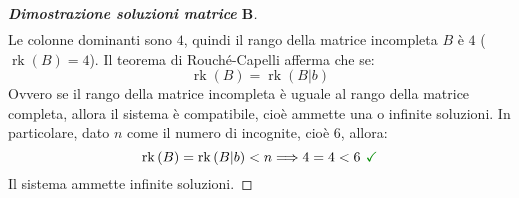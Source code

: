 \documentclass[a4paper]{article}
\DeclareMathOperator{\rk}{rk}
\begin{document}
\begin{proof}[\textbf{Dimostrazione soluzioni matrice} $\boldsymbol{B}$]
\begin{gather*}
		\end{gather*}
		Le colonne dominanti sono $4$, quindi il rango della matrice incompleta $B$ è $4$ ($\rk\left(B\right) = 4$). Il teorema di Rouché-Capelli afferma che se:
		\begin{equation*}
			\rk\left(B\right) = \rk\left(B|b\right)
		\end{equation*}
		Ovvero se il rango della matrice incompleta è uguale al rango della matrice completa, allora il sistema è compatibile, cioè ammette una o infinite soluzioni. In particolare, dato $n$ come il numero di incognite, cioè $6$, allora:
		\begin{equation*}
			\rk\left(B\right) = \rk\left(B|b\right) < n \Longrightarrow 4 = 4 < 6 \textcolor{Green4}{\textbf{ \checkmark}}
		\end{equation*}
		Il sistema ammette infinite soluzioni.
	\end{proof}\newpage
	
\end{document}
